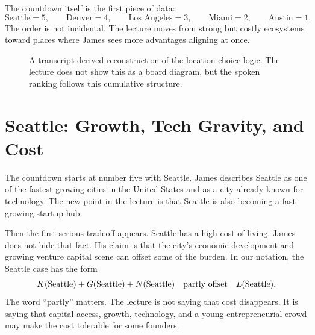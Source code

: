 The countdown itself is the first piece of data:
\begin{equation}
\text{Seattle}=5,\qquad
\text{Denver}=4,\qquad
\text{Los Angeles}=3,\qquad
\text{Miami}=2,\qquad
\text{Austin}=1.
\end{equation}
The order is not incidental. The lecture moves from strong but costly ecosystems toward places where James sees more advantages aligning at once.

\begin{figure}
\centering
{}
\caption{A transcript-derived reconstruction of the location-choice logic. The lecture does not show this as a board diagram, but the spoken ranking follows this cumulative structure.}
\end{figure}

\section{Seattle: Growth, Tech Gravity, and Cost}

The countdown starts at number five with Seattle. James describes Seattle as one of the fastest-growing cities in the United States and as a city already known for technology. The new point in the lecture is that Seattle is also becoming a fast-growing startup hub.

Then the first serious tradeoff appears. Seattle has a high cost of living. James does not hide that fact. His claim is that the city's economic development and growing venture capital scene can offset some of the burden. In our notation, the Seattle case has the form
\begin{equation}
K(\text{Seattle})+G(\text{Seattle})+N(\text{Seattle})
\quad \hbox{partly offset} \quad
L(\text{Seattle}).
\end{equation}
The word ``partly'' matters. The lecture is not saying that cost disappears. It is saying that capital access, growth, technology, and a young entrepreneurial crowd may make the cost tolerable for some founders.

